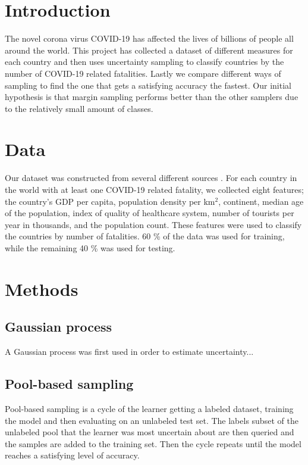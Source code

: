 \documentclass[12pt,fleqn]{article}
\begin{document}
	\begin{multicols}{2}
		
		
		\section{Introduction} %
		The novel corona virus COVID-19 has affected the lives of billions of people all around the world. This project has collected a dataset of different measures for each country and then uses uncertainty sampling to classify countries by the number of COVID-19 related fatalities. Lastly we compare different ways of sampling to find the one that gets a satisfying accuracy the fastest. Our initial hypothesis is that margin sampling performs better than the other samplers due to the relatively small amount of classes. 
		
		\section{Data} 
		Our dataset was constructed from several different sources \cite{density, corona, alder, bnp, region, healthcare, turist}. For each country in the world with at least one COVID-19 related fatality, we collected eight features; the country's GDP per capita, population density per km$^2$, continent, median age of the population, index of quality of healthcare system, number of tourists per year in thousands, and the population count. These features were used to classify the countries by number of fatalities. 60 \% of the data was used for training, while the remaining 40 \% was used for testing.

		\section{Methods}
		\subsection{Gaussian process} %
		A Gaussian process was first used in order to estimate uncertainty...
		
		
		\subsection{Pool-based sampling}
		Pool-based sampling is a cycle of the learner getting a labeled dataset, training the model and then evaluating on an unlabeled test set. The labels subset of the unlabeled pool that the learner was most uncertain about are then queried and the samples are added to the training set. Then the cycle repeats until the model reaches a satisfying level of accuracy.  
		

\end{multicols}
\end{document}
